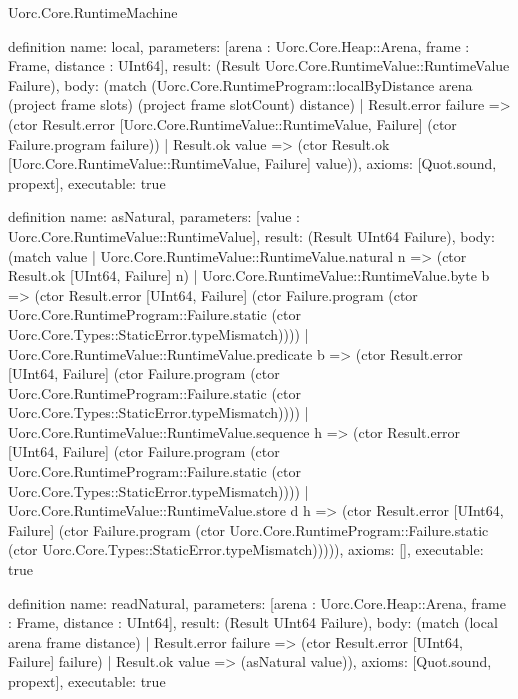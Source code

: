 \begin{lexlean}{Uorc.Core.RuntimeMachine}
\begin{semanticmodule}
definition{
  name: local,
  parameters: [arena : Uorc.Core.Heap::Arena, frame : Frame, distance : UInt64],
  result: (Result Uorc.Core.RuntimeValue::RuntimeValue Failure),
  body: (match (Uorc.Core.RuntimeProgram::localByDistance arena (project frame slots) (project frame slotCount) distance)
    | Result.error failure => (ctor Result.error [Uorc.Core.RuntimeValue::RuntimeValue, Failure] (ctor Failure.program failure))
    | Result.ok value => (ctor Result.ok [Uorc.Core.RuntimeValue::RuntimeValue, Failure] value)),
  axioms: [Quot.sound, propext],
  executable: true
}

definition{
  name: asNatural,
  parameters: [value : Uorc.Core.RuntimeValue::RuntimeValue],
  result: (Result UInt64 Failure),
  body: (match value
    | Uorc.Core.RuntimeValue::RuntimeValue.natural n => (ctor Result.ok [UInt64, Failure] n)
    | Uorc.Core.RuntimeValue::RuntimeValue.byte b => (ctor Result.error [UInt64, Failure] (ctor Failure.program (ctor Uorc.Core.RuntimeProgram::Failure.static (ctor Uorc.Core.Types::StaticError.typeMismatch))))
    | Uorc.Core.RuntimeValue::RuntimeValue.predicate b => (ctor Result.error [UInt64, Failure] (ctor Failure.program (ctor Uorc.Core.RuntimeProgram::Failure.static (ctor Uorc.Core.Types::StaticError.typeMismatch))))
    | Uorc.Core.RuntimeValue::RuntimeValue.sequence h => (ctor Result.error [UInt64, Failure] (ctor Failure.program (ctor Uorc.Core.RuntimeProgram::Failure.static (ctor Uorc.Core.Types::StaticError.typeMismatch))))
    | Uorc.Core.RuntimeValue::RuntimeValue.store d h => (ctor Result.error [UInt64, Failure] (ctor Failure.program (ctor Uorc.Core.RuntimeProgram::Failure.static (ctor Uorc.Core.Types::StaticError.typeMismatch))))),
  axioms: [],
  executable: true
}

definition{
  name: readNatural,
  parameters: [arena : Uorc.Core.Heap::Arena, frame : Frame, distance : UInt64],
  result: (Result UInt64 Failure),
  body: (match (local arena frame distance)
    | Result.error failure => (ctor Result.error [UInt64, Failure] failure)
    | Result.ok value => (asNatural value)),
  axioms: [Quot.sound, propext],
  executable: true
}


\end{semanticmodule}
\end{lexlean}
